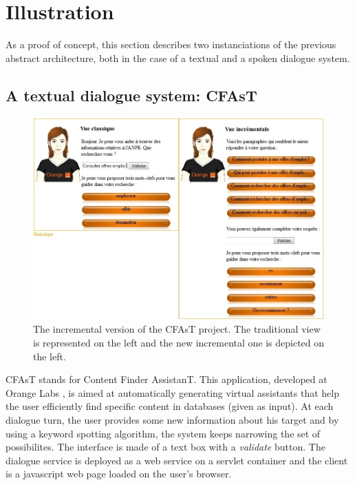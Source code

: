         
\section{Illustration}

        As a proof of concept, this section describes two instanciations of the previous abstract architecture, both in the case of a textual and a spoken dialogue system.

	\subsection{A textual dialogue system: CFAsT}
    
    	\begin{figure}[ht]
          \centering
          \includegraphics[scale=0.6]{figures/CFAsTIncr.jpg}
          \caption{The incremental version of the CFAsT project. The traditional view is represented on the left and the new incremental one is depicted on the left.}
          \label{fig:CFAsTIncr}
        \end{figure}
        
        CFAsT stands for Content Finder AssistanT. This application, developed at Orange Labs \cite{Laroche2014,Laroche2015}, is aimed at automatically generating virtual assistants that help the user efficiently find specific content in databases (given as input). At each dialogue turn, the user provides some new information about his target and by using a keyword spotting algorithm, the system keeps narrowing the set of possibilites. The interface is made of a text box with a \textit{validate} button. The dialogue service is deployed as a web service on a servlet container and the client is a javascript web page loaded on the user's browser.
        
